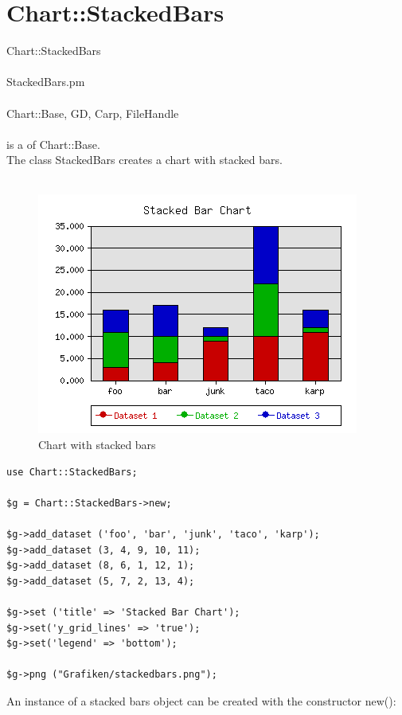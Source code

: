 \section{Chart::StackedBars}
 Chart::StackedBars\\ \\
 StackedBars.pm\\ \\
Chart::Base, GD, Carp, FileHandle\\ \\
  is a  of Chart::Base.\\
The class StackedBars creates a chart with stacked bars.\\
\\
\begin{figure}[h]
	\begin{center}
		\includegraphics[scale=0.6]{stackedbars.png}
	\end{center}
	\caption{Chart with stacked bars}
	\label{fig:stackedbars}
\end{figure}
\begin{verbatim}
use Chart::StackedBars;

$g = Chart::StackedBars->new;

$g->add_dataset ('foo', 'bar', 'junk', 'taco', 'karp');
$g->add_dataset (3, 4, 9, 10, 11);
$g->add_dataset (8, 6, 1, 12, 1);
$g->add_dataset (5, 7, 2, 13, 4);

$g->set ('title' => 'Stacked Bar Chart');
$g->set('y_grid_lines' => 'true');
$g->set('legend' => 'bottom');

$g->png ("Grafiken/stackedbars.png");
\end{verbatim}
 An instance of a stacked bars object can be created with the constructor new():\\
